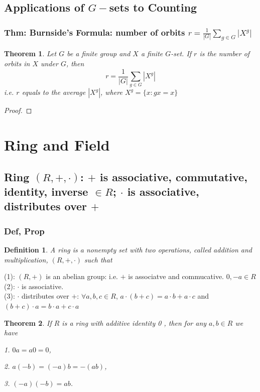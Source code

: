 \documentclass[11pt,a4paper]{article}
\newtheorem{theorem}{Theorem}
\newtheorem{definition}{Definition}
\begin{document}
\subsection{Applications of $G-$sets to Counting}
\subsubsection{Thm: Burnside's Formula: number of orbits $r=\frac{1}{|G|}\sum_{g\in G}|X^g|$}
\begin{theorem}
    Let $G$ be a finite group and $X$ a finite $G$-set. If $r$ is the number
    of orbits in $X$ under $G$, then $$r=\frac{1}{|G|}\sum_{g\in G}|X^g|$$ i.e. $r$ equals to the average $|X^g|$, where $X^g=\{x:gx=x\}$
\end{theorem}
\begin{proof}

\end{proof}






\section{Ring and Field}
\subsection{Ring $(R,+,\cdot)$: $+$ is associative, commutative, identity, inverse $\in R$; $\cdot$ is associative, distributes over $+$}
\subsubsection{Def, Prop}
\begin{definition}
    A ring is a nonempty set with two operations, called addition and multiplication, $(R,+,\cdot)$ such that
\end{definition}
(1): $(R,+)$ is an abelian group: i.e. $+$ is associatve and commucative. $0,-a\in R$\\
(2): $\cdot$ is associative.\\
(3): $\cdot$ distributes over $+$: $\forall a,b,c\in R$, $a\cdot(b+c)=a\cdot b+a\cdot c$ and $(b+c)\cdot a=b\cdot a+c\cdot a$

\begin{theorem}
    If $R$ is a ring with additive identity 0 , then for any $a, b \in R$ we have

    1. $0 a=a 0=0$,

    2. $a(-b)=(-a) b=-(a b)$,

    3. $(-a)(-b)=a b$.
\end{theorem}
\end{document}

